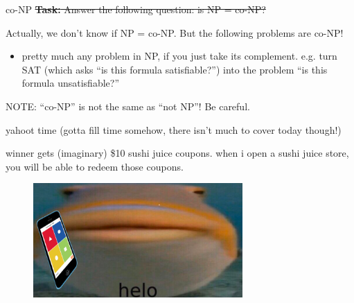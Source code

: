\documentclass{beamer}
\begin{document}
\begin{frame}{co-NP}
\sout{\textbf{Task:} Answer the following question: is NP = co-NP?}

Actually, we don't know if NP = co-NP. But the following problems are co-NP!
\begin{itemize}
\item pretty much any problem in NP, if you just take its complement. e.g. turn SAT (which asks ``is this formula satisfiable?'') into the problem ``is this formula unsatisfiable?''
\end{itemize}

NOTE: ``co-NP'' is not the same as ``not NP''! Be careful.
\end{frame}


\begin{frame}{yahoot time}
(gotta fill time somehow, there isn't much to cover today though!)

\vspace{2mm}

winner gets (imaginary) \$10 sushi juice coupons. when i open a sushi juice store, you will be able to redeem those coupons.

\begin{figure}[h]
\centering
\includegraphics[width=8cm]{img/helo_fish_kahoot.jpg}
\end{figure}



 
\end{frame}
\end{document}

